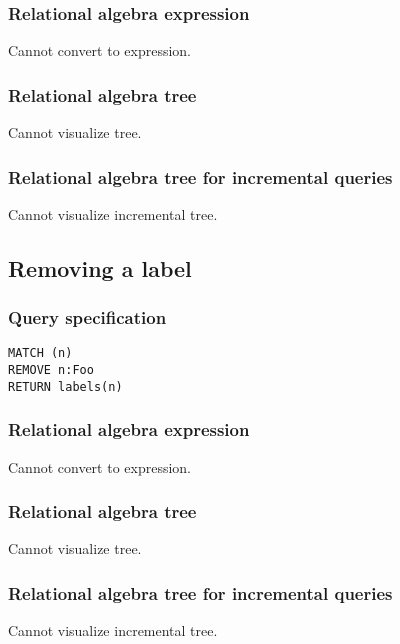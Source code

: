 \subsubsection*{Relational algebra expression}

Cannot convert to expression.

\subsubsection*{Relational algebra tree}

Cannot visualize tree.

\subsubsection*{Relational algebra tree for incremental queries}

Cannot visualize incremental tree.

\subsection{Removing a label}

\subsubsection*{Query specification}

\begin{lstlisting}
MATCH (n)
REMOVE n:Foo
RETURN labels(n)
\end{lstlisting}

\subsubsection*{Relational algebra expression}

Cannot convert to expression.

\subsubsection*{Relational algebra tree}

Cannot visualize tree.

\subsubsection*{Relational algebra tree for incremental queries}

Cannot visualize incremental tree.

